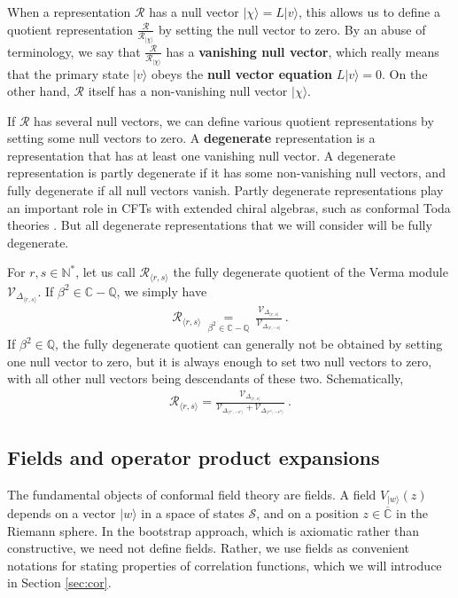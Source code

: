 \documentclass[12pt, a4paper]{article}
\theoremstyle{break}
\begin{document}
When a representation $\mathcal{R}$ has a null vector $|\chi\rangle=L|v\rangle$, this allows us to define a quotient representation $\frac{\mathcal{R}}{\mathcal{R}_{|\chi\rangle}}$ by setting the null vector to zero. 
By an abuse of terminology, we say that $\frac{\mathcal{R}}{\mathcal{R}_{|\chi\rangle}}$ has a \textbf{vanishing null vector}, which really means that the primary state $|v\rangle$ obeys the \textbf{null vector equation} $L|v\rangle=0$. On the other hand, $\mathcal{R}$ itself has a non-vanishing null vector $|\chi\rangle$. 

If $\mathcal{R}$ has several null vectors, we can define various quotient representations by setting some null vectors to zero. A \textbf{degenerate} representation is a representation that has at least one vanishing null vector. A degenerate representation is partly degenerate if it has some non-vanishing null vectors, and fully degenerate if all null vectors vanish. Partly degenerate representations play an important role in CFTs with extended chiral algebras, such as conformal Toda theories \cite{fl07c}. But all degenerate representations that we will consider will be fully degenerate. 

For $r,s\in\mathbb{N}^*$, let us call $\mathcal{R}_{\langle r,s\rangle}$ the fully degenerate quotient of the Verma module $\mathcal{V}_{\Delta_{\langle r,s\rangle}}$. If $\beta^2\in \mathbb{C}-\mathbb{Q}$, we simply have 
\begin{align}
 \mathcal{R}_{\langle r,s\rangle} \ \underset{\beta^2\in \mathbb{C}-\mathbb{Q}}{=}\ \frac{\mathcal{V}_{\Delta_{\langle r,s\rangle}}}{\mathcal{V}_{\Delta_{\langle r,-s\rangle}}}\ . 
 \label{rvv}
\end{align}
If $\beta^2\in \mathbb{Q}$, the fully degenerate quotient can generally not be obtained by setting one null vector to zero, but it is always enough to set two null vectors to zero, with all other null vectors being descendants of these two. Schematically,
\begin{align}
 \mathcal{R}_{\langle r,s\rangle} = \frac{\mathcal{V}_{\Delta_{\langle r,s\rangle}}}{\mathcal{V}_{\Delta_{\langle r',-s'\rangle}}+ \mathcal{V}_{\Delta_{\langle r'',-s''\rangle}}}\ .
\end{align}


\subsection{Fields and operator product expansions}

The fundamental objects of conformal field theory are fields. A field $V_{|w\rangle}(z)$ depends on a vector $|w\rangle$ in a space of states $\mathcal{S}$, and on a position $z\in\overline{\mathbb{C}}$ in the Riemann sphere. In the bootstrap approach, which is axiomatic rather than constructive, we need not define fields. Rather, we use fields as convenient notations for stating properties of correlation functions, which we will introduce in Section \ref{sec:cor}. 
\end{document}
